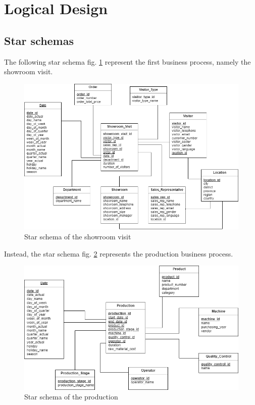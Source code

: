 \documentclass[letterpaper,12pt]{article}
\begin{document}
\section{Logical Design}

\subsection{Star schemas}

The following star schema fig. \ref{fig:starschemaShowroom} represent the first business process, namely the showroom visit.

\begin{figure}[h] 
        \centering
        \includegraphics[width=\columnwidth]{../images/Starschema_Showroom_visit.png}
        \caption{
                \label{fig:starschemaShowroom}  
                Star schema of the showroom visit
        }
\end{figure}

Instead, the star schema fig. \ref{fig:starschemaProduction} represents the production business process.

\begin{figure}[h] 
        \centering
        \includegraphics[width=\columnwidth]{../images/Starschema_Production.png}
        \caption{
                \label{fig:starschemaProduction}  
                Star schema of the production
        }
\end{figure}
\end{document}
